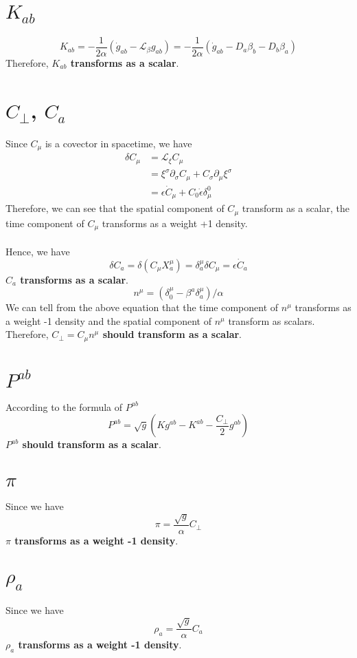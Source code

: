 \documentclass{article}
\begin{document}
\section{$K_{ab}$}
\[
K_{ab} = -\frac{1}{2\alpha}({\dot g}_{ab} - \mathcal{L}_{\beta}g_{ab}) =  -\frac{1}{2\alpha}({\dot g}_{ab} - D_{a}\beta_{b} - D_{b}\beta_{a})
\]
Therefore, {\bf{\color{red}$K_{ab}$ transforms as a scalar}}. 
\section{$C_{\perp}$, $C_{a}$}
Since $C_{\mu}$ is a covector in spacetime, we have
\begin{align*}
\delta C_{\mu} & = \mathcal{L}_{\xi} C_{\mu}\\
& = \xi^{\sigma}\partial_{\sigma}C_{\mu} + C_{\sigma}\partial_{\mu}\xi^{\sigma}\\
& = \epsilon {\dot C}_{\mu} + C_{0}{\dot \epsilon}\delta^{0}_{\mu} 
\end{align*}
Therefore, we can see that the spatial component of $C_{\mu}$ transform as a scalar, the time component of $C_{\mu}$ transforms as a weight +1 density. \\
\\
Hence, we have
\[
\boxed{
\delta C_{a} = \delta (C_{\mu}X_{a}^{\mu}) = \delta_{a}^{\mu} \delta C_{\mu} = \epsilon {\dot C}_{a}
}
\]
{\bf {\color {red}$C_{a}$ transforms as a scalar}}.
\[
n^{\mu} = (\delta^{\mu}_{0} - \beta^{a}\delta_{a}^{\mu})/\alpha
\]
We can tell from the above equation that the time component of $n^{\mu}$ transforms as a weight -1 density and the spatial component of $n^{\mu}$ transform as scalars. Therefore, {\bf {\color{red}$C_{\perp} = C_{\mu}n^{\mu}$ should transform as a scalar}}.
\section{$P^{ab}$}
According to the formula of $P^{ab}$
\[
P^{ab} = \sqrt{g}(Kg^{ab} - K^{ab} -\frac{C_{\perp}}{2}g^{ab})
\]
{\bf {\color{red} $P^{ab}$ should transform as a scalar}}.
\section{$\pi$}
Since we have
\[
\pi = \frac{\sqrt{g}}{\alpha}C_{\perp}
\]
{\bf{\color{red}$\pi$ transforms as a weight -1 density}}.
\section{$\rho_{a}$}
Since we have
\[
\rho_{a} = \frac{\sqrt{g}}{\alpha}C_{a}
\]
{\bf{\color{red}$\rho_{a}$ transforms as a weight -1 density}}.
\end{document}
